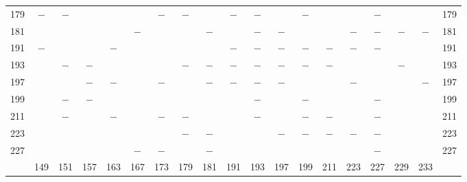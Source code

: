 \begin{center}
\begin{tabular}{r|c|c|c|c|c|c|c|c|c|c|c|c|c|c|c|c|c|r}
179 & $-$ & $-$ &  &  &  & $-$ & $-$ &  & $-$ & $-$ &  & $-$ &  &  & $-$ &  &  & 179\\
181 &  &  &  &  & $-$ &  &  & $-$ &  & $-$ & $-$ &  &  & $-$ & $-$ & $-$ & $-$ & 181\\
191 & $-$ &  &  & $-$ &  &  &  &  & $-$ & $-$ & $-$ & $-$ & $-$ & $-$ & $-$ &  &  & 191\\
193 &  & $-$ & $-$ &  &  &  & $-$ & $-$ & $-$ & $-$ & $-$ & $-$ & $-$ &  &  & $-$ &  & 193\\
197 &  &  & $-$ & $-$ &  & $-$ &  & $-$ & $-$ & $-$ & $-$ &  &  & $-$ &  &  & $-$ & 197\\
199 &  & $-$ & $-$ &  &  &  &  &  &  & $-$ &  & $-$ &  &  & $-$ &  &  & 199\\
211 &  & $-$ &  & $-$ &  & $-$ & $-$ &  &  & $-$ &  & $-$ & $-$ &  & $-$ &  &  & 211\\
223 &  &  &  &  &  &  & $-$ & $-$ &  &  & $-$ & $-$ & $-$ & $-$ & $-$ &  &  & 223\\
227 &  &  &  &  & $-$ & $-$ &  & $-$ &  &  &  &  &  &  & $-$ &  &  & 227\\
\hline
 & 149 & 151 & 157 & 163 & 167 & 173 & 179 & 181 & 191 & 193 & 197 & 199 & 211 & 223 & 227 & 229 & 233 & \\
\hline
\end{tabular}\endgroup\end{center}
\clearpage

